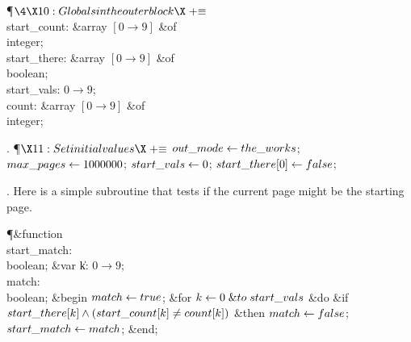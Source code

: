 \Y\P$\4\X10:Globals in the outer block\X\mathrel{+}\S$\6
\4\\{start\_count}: \&{array} $[0\to9]$ \1\&{of}\5
\\{integer};\2\6
\4\\{start\_there}: \&{array} $[0\to9]$ \1\&{of}\5
\\{boolean};\2\6
\4\\{start\_vals}: $0\to9$;\6
\4\\{count}: \&{array} $[0\to9]$ \1\&{of}\5
\\{integer};\2\par
\fi

. \P$\X11:Set initial values\X\mathrel{+}\S$\6
$\\{out\_mode}\gets\\{the\_works}$;\5
$\\{max\_pages}\gets1000000$;\5
$\\{start\_vals}\gets0$;\5
$\\{start\_there}[0]\gets\\{false}$;\par
\fi

. Here is a simple subroutine that tests if the current page might be the
starting page.

\Y\P\4\&{function}\1\  \\{start\_match}: \\{boolean};\6
\4\&{var} \|k: $0\to9$;\6
\\{match}: \\{boolean};\2\6
\&{begin} $\\{match}\gets\\{true}$;\6
\&{for} $\hbox{$k$}\gets0\mathrel{\&{to}}\\{start\_vals}$ \1\&{do}\6
\&{if} $\\{start\_there}[\hbox{$k$}]\land(\\{start\_count}[\hbox{$k$}]\ne\\{count}[\hbox{$k$}])$ \1%
\&{then}\5
$\\{match}\gets\\{false}$;\2\2\6
$\\{start\_match}\gets\\{match}$;\6
\&{end};\par
\fi

